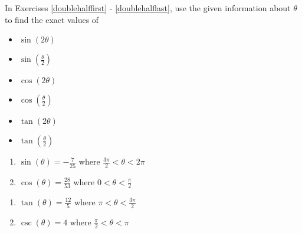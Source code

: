 In Exercises \ref{doublehalffirst} - \ref{doublehalflast}, use the given information about $\theta$ to find the exact values of 

\begin{multicols}{3}

\begin{itemize}

\item $\sin(2\theta)$
\item $\sin\left(\frac{\theta}{2}\right)$
\item $\cos(2\theta)$
\item $\cos\left(\frac{\theta}{2}\right)$
\item $\tan(2\theta)$
\item $\tan\left(\frac{\theta}{2}\right)$

\end{itemize}

\end{multicols}

\begin{multicols}{2}

\begin{enumerate}

\setcounter{enumi}{\value{HW}}

\item $\sin(\theta) = -\frac{7}{25}$ where $\frac{3\pi}{2} < \theta < 2\pi$ \label{doublehalffirst}
\item $\cos(\theta) = \frac{28}{53}$ where $0 < \theta < \frac{\pi}{2}$

\setcounter{HW}{\value{enumi}}

\end{enumerate}

\end{multicols}

\begin{multicols}{2}

\begin{enumerate}

\setcounter{enumi}{\value{HW}}

\item $\tan(\theta) = \frac{12}{5}$ where $\pi < \theta < \frac{3\pi}{2}$
\item $\csc(\theta) = 4$ where $\frac{\pi}{2} < \theta < \pi$

\setcounter{HW}{\value{enumi}}

\end{enumerate}

\end{multicols}

